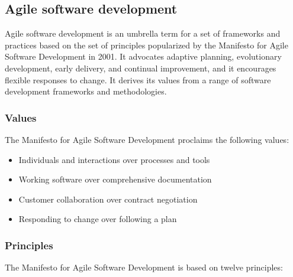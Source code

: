 \subsection{Agile software development}

Agile software development is an umbrella term for a set of frameworks and practices based on the set of principles popularized by the Manifesto for Agile Software Development in 2001.
It advocates adaptive planning, evolutionary development, early delivery, and continual improvement, and it encourages flexible responses to change.
It derives its values from a range of software development frameworks and methodologies.

\subsubsection{Values}

The Manifesto for Agile Software Development proclaims the following values:

\begin{itemize}
	\item Individuals and interactions over processes and tools
	\item Working software over comprehensive documentation
	\item Customer collaboration over contract negotiation
	\item Responding to change over following a plan
\end{itemize}

\subsubsection{Principles}

The Manifesto for Agile Software Development is based on twelve principles:

